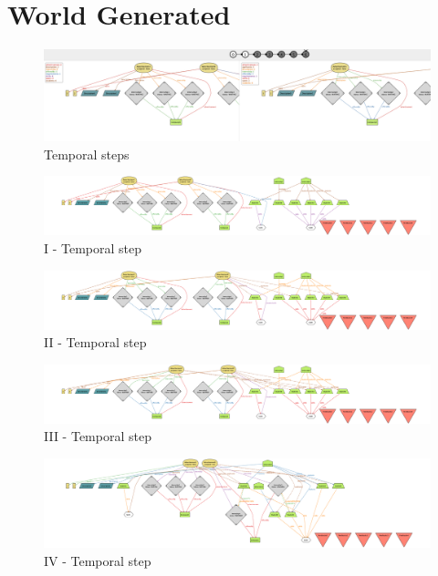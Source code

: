 \section{World Generated}

\begin{figure}[H]
    \centering
    \includegraphics[width=450px]{../assets/alloy-world/world-steps.png}
    \caption*{Temporal steps}
\end{figure}

\begin{figure}[H]
    \centering
    \includegraphics[width=450px]{../assets/alloy-world/I-step.png}
    \caption*{I - Temporal step}
\end{figure}

\begin{figure}[H]
    \centering
    \includegraphics[width=450px]{../assets/alloy-world/II-step.png}
     \caption*{II - Temporal step}
\end{figure}

\begin{figure}[H]
    \centering
    \includegraphics[width=450px]{../assets/alloy-world/III-step.png}
    \caption*{III - Temporal step}
\end{figure}

\begin{figure}[H]
    \centering
    \includegraphics[width=450px]{../assets/alloy-world/IV-step.png}
    \caption*{IV - Temporal step}
\end{figure}

